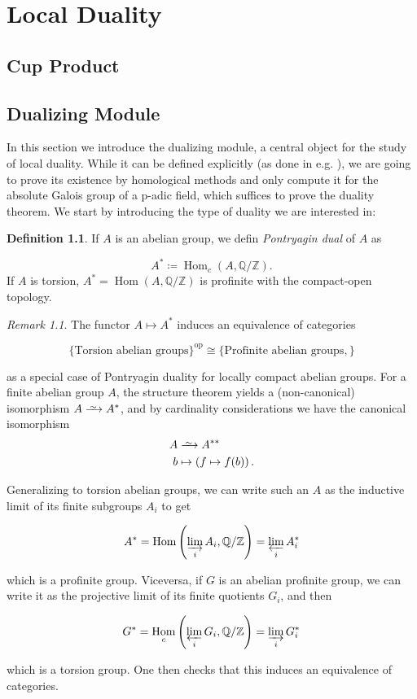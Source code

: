 \documentclass[a4paper]{report}
\def\Q{\mathbb{Q}}
\def\Z{\mathbb{Z}}
\DeclareMathOperator{\Hom}{Hom}
\newcommand\Iso{\xrightarrow{
   \,\smash{\raisebox{-0.65ex}{\ensuremath{\scriptstyle\sim}}}\,}}
\theoremstyle{plain}
\theoremstyle{definition}
\newtheorem{definition}[theorem]{Definition}
\theoremstyle{remark}
\newtheorem*{remark}{Remark}
\begin{document}
\chapter{Local Duality}

\section{Cup Product}

\section{Dualizing Module}

In this section we introduce the dualizing module, a central object for the study of local duality. While it can be defined explicitly (as done in e.g. \cite{Neukirch}),
we are going to prove its existence by homological methods and only compute it for the absolute Galois group of a p-adic field, which suffices to prove the duality theorem. We
start by introducing the type of duality we are interested in:

\begin{definition}
    If \(A\) is an abelian group, we defin \textit{Pontryagin dual} of \(A\) as

    \[
        A^*\coloneqq \Hom_{c}(A,\Q/\Z)
        .\]
    If \(A\) is torsion, \(A^*=\Hom(A,\Q/\Z)\) is profinite with the compact-open topology.
\end{definition}

\begin{remark}
    The functor \(A\mapsto A^*\)  induces an equivalence of categories

    \[
        \{ \text{Torsion abelian groups} \}^{\text{op}}  \cong \{ \text{Profinite abelian groups}, \}
    \]

    as a special case of Pontryagin duality for locally compact abelian groups.
    For a finite abelian group \(A\), the structure theorem yields a (non-canonical) isomorphism \(A\Iso A^*\), and by cardinality considerations we have the canonical isomorphism
    \begin{align*}
        A & \Iso A^{**}                           \\
        b & \mapsto \left( f\mapsto f(b) \right).
    \end{align*}

    Generalizing to torsion abelian groups, we can write such an \(A\) as the inductive limit of its finite subgroups \(A_i\) to get

    \[
        A^* = \Hom\left(\varinjlim_i A_i,\Q/\Z\right) = \varprojlim_i A_i^*
    \]

    which is a profinite group. Viceversa, if \(G\) is an abelian profinite group, we can write it as the projective limit of its finite quotients \(G_i\), and then

    \[
        G^* = \Hom_{c}\left( \varprojlim_i G_i,\Q/\Z \right) = \varinjlim_i G_i^*
    \]

    which is a torsion group. One then checks that this induces an equivalence of categories.
\end{remark}
\end{document}
